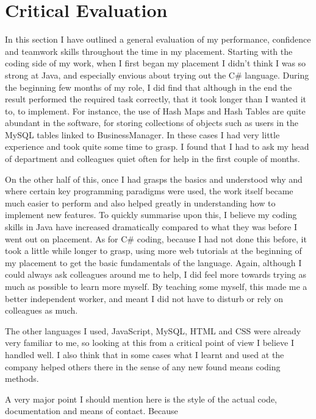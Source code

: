 \documentclass[12pt]{article}
\begin{document}
\section{Critical Evaluation}
In this section I have outlined a general evaluation of my performance, confidence and teamwork skills throughout the
time in my placement. Starting with the coding side of my work, when I first began my placement I didn’t think I was so
strong at Java, and especially envious about trying out the C\# language. During the beginning few months of my role, I
did find that although in the end the result performed the required task correctly, that it took longer than I wanted it
to, to implement. For instance, the use of Hash Maps and Hash Tables are quite abundant in the software, for storing
collections of objects such as users in the MySQL tables linked to BusinessManager. In these cases I had very little
experience and took quite some time to grasp. I found that I had to ask my head of department and colleagues quiet often
for help in the first couple of months.\\ \par \noindent
On the other half of this, once I had grasps the basics and understood why and where certain key programming paradigms
were used, the work itself became much easier to perform and also helped greatly in understanding how to implement new
features. To quickly summarise upon this, I believe my coding skills in Java have increased dramatically compared to
what they was before I went out on placement. As for C\# coding, because I had not done this before, it took a little
while longer to grasp, using more web tutorials at the beginning of my placement to get the basic fundamentals of the
language. Again, although I could always ask colleagues around me to help, I did feel more towards trying as much as
possible to learn more myself. By teaching some myself, this made me a better independent worker, and meant I did not
have to disturb or rely on colleagues as much.\\ \par \noindent
The other languages I used, JavaScript, MySQL, HTML and CSS were already very familiar to me, so looking at this from a
critical point of view I believe I handled well. I also think that in some cases what I learnt and used at the company
helped others there in the sense of any new found means coding methods.\\ \par \noindent
A very major point I should mention here is the style of the actual code, documentation and means of contact. Because
\end{document}
